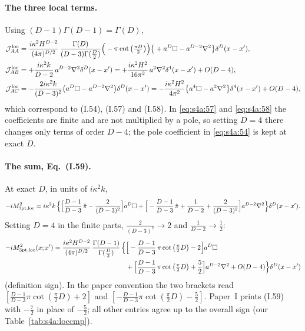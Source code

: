 \documentclass[aps,prd,onecolumn,10pt,nofootinbib,floatfix]{revtex4-2}
\newcommand{\PI}{Paper~I}
\newcommand{\eqI}[1]{(I.#1)}
\newcommand{\pihat}{\hat\pi}
\begin{document}
\paragraph*{The three local terms.}
Using $(D-1)\Gamma(D-1)=\Gamma(D)$,
\begin{align}
\mathcal J_{AA}^{\rm loc}&=\frac{i\kappa^2H^{D-2}}{(4\pi)^{D/2}}\,\frac{\Gamma(D)}{(D-3)\Gamma(\frac D2)}
\Big(-\pi\cot\big(\tfrac{\pi D}{2}\big)\Big)\big\{+a^D\square-a^{D-2}\nabla^2\big\}\delta^D(x-x'),
\label{eq:s4a:54}\\
\mathcal J_{AB}^{\rm loc}&=+\frac{i\kappa^2k}{D-2}\,a^{D-2}\nabla^2\delta^D(x-x')
=+\frac{i\kappa^2H^2}{16\pi^2}\,a^2\nabla^2\delta^4(x-x')+O(D-4),
\label{eq:s4a:57}\\
\mathcal J_{AC}^{\rm loc}&=-\frac{2i\kappa^2k}{(D-3)^2}\big(a^D\square-a^{D-2}\nabla^2\big)\delta^D(x-x')
=-\frac{i\kappa^2H^2}{4\pi^2}\big\{a^4\square-a^2\nabla^2\big\}\delta^4(x-x')+O(D-4),
\label{eq:s4a:58}
\end{align}
which correspond to \eqI{54}, \eqI{57} and \eqI{58}. In \eqref{eq:s4a:57} and \eqref{eq:s4a:58} the
coefficients are finite and are not multiplied by a pole, so setting $D=4$ there changes only terms
of order $D-4$; the pole coefficient in \eqref{eq:s4a:54} is kept at exact $D$.

\paragraph*{The sum, Eq.~(I.59).}
At exact $D$, in units of $i\kappa^2k$,
\begin{equation}
-iM^2_{\rm 3pt,loc}=i\kappa^2k\,\Big\{\Big[\frac{D-1}{D-3}\,\pihat-\frac{2}{(D-3)^2}\Big]a^D\square
+\Big[-\frac{D-1}{D-3}\,\pihat+\frac{1}{D-2}+\frac{2}{(D-3)^2}\Big]a^{D-2}\nabla^2\Big\}\delta^D(x-x').
\label{eq:s4a:59exact}
\end{equation}
Setting $D=4$ in the finite parts, $\frac{2}{(D-3)^2}\to2$ and $\frac1{D-2}\to\frac12$:
\begin{equation}
\begin{aligned}
-iM^2_{\rm 3pt,loc}(x;x')=\frac{i\kappa^2H^{D-2}}{(4\pi)^{D/2}}\,\frac{\Gamma(D-1)}{\Gamma(\frac D2)}\,\Big\{
&\Big[-\frac{D-1}{D-3}\,\pi\cot\big(\tfrac\pi2D\big)-2\Big]a^D\square\\
&+\Big[\frac{D-1}{D-3}\,\pi\cot\big(\tfrac\pi2D\big)+\frac52\Big]a^{D-2}\nabla^2+O(D-4)\Big\}\delta^D(x-x')
\end{aligned}
\label{eq:s4a:59}
\end{equation}
(definition sign). In the paper convention the two brackets read
$[\frac{D-1}{D-3}\pi\cot(\frac\pi2D)+2]$ and $[-\frac{D-1}{D-3}\pi\cot(\frac\pi2D)-\frac52]$. \PI{} prints
\eqI{59} with $-\frac72$ in place of $-\frac52$; all other entries agree up to the overall sign
(our Table~\ref{tab:s4a:loccmp}).
\end{document}
